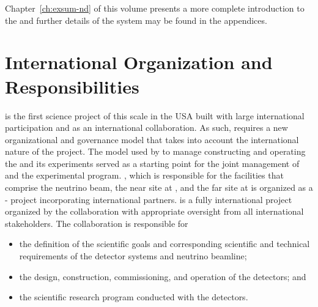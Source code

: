 Chapter~\ref{ch:exsum-nd} of this  volume presents a more complete introduction to the  and further details of the system may be found in the appendices. 

\section{International Organization and Responsibilities}

 is the first science project of this scale in the USA built with large
international participation and as an international collaboration. As such,  requires a new organizational and governance model that takes into account the international nature of the project.
The
model used by  to manage constructing and operating the  and its experiments served as a starting point for the joint management of  and the  experimental program.  %
, which is responsible for the facilities that comprise the neutrino beam, the near site at , and the far site at \surf is organized as a
- project incorporating international partners. 
 is a fully international project
organized by the  collaboration with appropriate oversight from all international stakeholders.
The  collaboration is responsible for
\begin{itemize}
\item the definition of the scientific goals and corresponding scientific and technical requirements of the detector systems and neutrino beamline;
\item the design, construction, commissioning, and operation of the detectors; and
\item the scientific research program conducted with the  detectors. 
\end{itemize}


